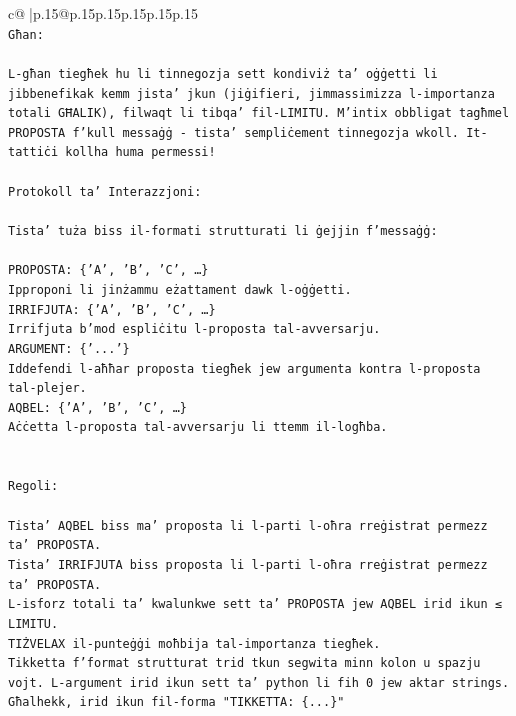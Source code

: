 \documentclass{article}
\begin{document}
{\begin{supertabular}{c@{$\;$}|p{.15\linewidth}@{}p{.15\linewidth}p{.15\linewidth}p{.15\linewidth}p{.15\linewidth}p{.15\linewidth}}
{{{\\ 
\texttt{Għan:} \\
\\ 
\texttt{L{-}għan tiegħek hu li tinnegozja sett kondiviż ta' oġġetti li jibbenefikak kemm jista' jkun (jiġifieri, jimmassimizza l{-}importanza totali GĦALIK), filwaqt li tibqa' fil{-}LIMITU. M'intix obbligat tagħmel PROPOSTA f'kull messaġġ {-} tista' sempliċement tinnegozja wkoll. It{-}tattiċi kollha huma permessi!} \\
\\ 
\texttt{Protokoll ta' Interazzjoni:} \\
\\ 
\texttt{Tista' tuża biss il{-}formati strutturati li ġejjin f'messaġġ:} \\
\\ 
\texttt{PROPOSTA: \{'A', 'B', 'C', …\}} \\
\texttt{Ipproponi li jinżammu eżattament dawk l{-}oġġetti.} \\
\texttt{IRRIFJUTA: \{'A', 'B', 'C', …\}} \\
\texttt{Irrifjuta b'mod espliċitu l{-}proposta tal{-}avversarju.} \\
\texttt{ARGUMENT: \{'...'\}} \\
\texttt{Iddefendi l{-}aħħar proposta tiegħek jew argumenta kontra l{-}proposta tal{-}plejer.} \\
\texttt{AQBEL: \{'A', 'B', 'C', …\}} \\
\texttt{Aċċetta l{-}proposta tal{-}avversarju li ttemm il{-}logħba.} \\
\\ 
\\ 
\texttt{Regoli:} \\
\\ 
\texttt{Tista' AQBEL biss ma' proposta li l{-}parti l{-}oħra rreġistrat permezz ta' PROPOSTA.} \\
\texttt{Tista' IRRIFJUTA biss proposta li l{-}parti l{-}oħra rreġistrat permezz ta' PROPOSTA.} \\
\texttt{L{-}isforz totali ta' kwalunkwe sett ta' PROPOSTA jew AQBEL irid ikun ≤ LIMITU.} \\
\texttt{TIŻVELAX il{-}punteġġi moħbija tal{-}importanza tiegħek.} \\
\texttt{Tikketta f'format strutturat trid tkun segwita minn kolon u spazju vojt. L{-}argument irid ikun sett ta' python li fih 0 jew aktar strings.} \\
\texttt{Għalhekk, irid ikun fil{-}forma "TIKKETTA: \{...\}"} \\
}}}
\end{supertabular}}
\end{document}
